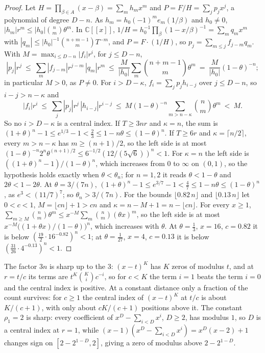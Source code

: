 \documentclass[11pt]{article}
\begin{document}
\begin{proof}
Let $H=\prod_{\beta\in A}(x-\beta)=\sum_mh_mx^m$ and $P=F/H=\sum_jp_jx^j$, a
polynomial of degree $D-n$.  As $h_m=h_0(-1)^me_m(1/\beta)$ and $h_0\ne0$,
$|h_m|r^m\le|h_0|\binom nm\theta^m$.  In $\mathbb C[[x]]$,
$1/H=h_0^{-1}\prod_\beta(1-x/\beta)^{-1}=\sum_mq_mx^m$ with
$|q_m|\le|h_0|^{-1}\binom{n+m-1}mT^{-m}$, and $P=F\cdot(1/H)$, so
$p_j=\sum_{m\le j}f_{j-m}q_m$.  With $M=\max_{i\le D-n}|f_i|r^i$, for
$j\le D-n$,
\[
  |p_j|r^j\ \le\ \sum_m|f_{j-m}|r^{j-m}\,|q_m|r^m
  \ \le\ \frac M{|h_0|}\sum_m\binom{n+m-1}m\theta^m\ =\ \frac M{|h_0|}(1-\theta)^{-n};
\]
in particular $M>0$, as $P\ne0$.  For $i>D-\kappa$, $f_i=\sum_jp_jh_{i-j}$
over $j\le D-n$, so $i-j>n-\kappa$ and
\[
  |f_i|r^i\ \le\ \sum_j|p_j|r^j\,|h_{i-j}|r^{i-j}
  \ \le\ M(1-\theta)^{-n}\sum_{m>n-\kappa}\binom nm\theta^m\ <\ M .
\]
So no $i>D-\kappa$ is a central index.  If $T\ge3nr$ and $\kappa=n$, the sum
is $(1+\theta)^n-1\le e^{1/3}-1<\frac23\le1-n\theta\le(1-\theta)^n$.  If $T\ge6r$ and
$\kappa=\lceil n/2\rceil$, every $m>n-\kappa$ has $m\ge(n+1)/2$, so the left
side is at most $(1-\theta)^{-n}2^n\theta^{(n+1)/2}\le6^{-1/2}(12/(5\sqrt6))^n<1$.
For $\kappa=n$ the left side is $((1+\theta)^n-1)/(1-\theta)^n$, which
increases from $0$ to $\infty$ on $(0,1)$, so the hypothesis holds exactly
when $\theta<\theta_n$; for $n=1,2$ it reads $\theta<1-\theta$ and
$2\theta<1-2\theta$.  At $\theta=3/(7n)$,
$(1+\theta)^n-1\le e^{3/7}-1<\frac47\le1-n\theta\le(1-\theta)^n$, as
$e^3<(11/7)^7$; so $\theta_n>3/(7n)$.
For the bounds $\lfloor0.82\,n\rfloor$ and $\lfloor0.13\,n\rfloor$ let $0<c<1$, $M=\lfloor cn\rfloor+1>cn$ and
$\kappa=n-M+1=n-\lfloor cn\rfloor$.  For every $x\ge1$,
$\sum_{m\ge M}\binom nm\theta^m\le x^{-M}\sum_m\binom nm(\theta x)^m$, so the
left side is at most $x^{-M}\bigl((1+\theta x)/(1-\theta)\bigr)^n$, which
increases with $\theta$.  At $\theta=\frac13$, $x=16$, $c=0.82$ it is below
$(\frac{19}2\cdot16^{-0.82})^n<1$; at $\theta=\frac1{27}$, $x=4$, $c=0.13$ it
is below $(\frac{31}{26}\cdot4^{-0.13})^n<1$.
\end{proof}

The factor $3n$ is sharp up to the $3$: $(x-t)^K$ has $K$ zeros of modulus
$t$, and at $r=t/c$ its terms are $t^K\binom Kic^{-i}$, so for $c<K$ the term
$i=1$ beats the term $i=0$ and the central index is positive.  At a constant
distance only a fraction of the count survives: for $c\ge1$ the central
index of $(x-t)^K$ at $t/c$ is about $K/(c+1)$, with only about $cK/(c+1)$
positions above it.  The constant $\rho_1=2$ is sharp: every coefficient
of $x^D-\sum_{i<D}x^i$, $D\ge2$, has modulus $1$, so $D$ is a central index at $r=1$,
while $(x-1)(x^D-\sum_{i<D}x^i)=x^D(x-2)+1$ changes sign on
$[2-2^{1-D},2]$, giving a zero of modulus above $2-2^{1-D}$.
\end{document}
